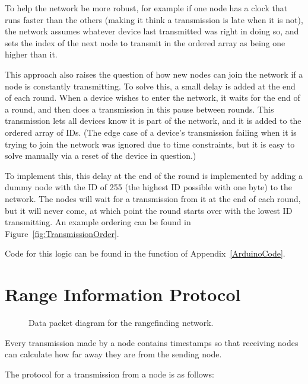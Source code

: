 To help the network be more robust, for example if one node has a clock that runs faster than the others (making it think a transmission is late when it is not), the network assumes whatever device last transmitted was right in doing so, and sets the index of the next node to transmit in the ordered array as being one higher than it.

This approach also raises the question of how new nodes can join the network if a node is constantly transmitting. To solve this, a small delay is added at the end of each round. When a device wishes to enter the network, it waits for the end of a round, and then does a transmission in this pause between rounds. This transmission lets all devices know it is part of the network, and it is added to the ordered array of IDs. (The edge case of a device's transmission failing when it is trying to join the network was ignored due to time constraints, but it is easy to solve manually via a reset of the device in question.)

To implement this, this delay at the end of the round is implemented by adding a dummy node with the ID of 255 (the highest ID possible with one byte) to the network. The nodes will wait for a transmission from it at the end of each round, but it will never come, at which point the round starts over with the lowest ID transmitting. An example ordering can be found in Figure~\ref{fig:TransmissionOrder}.

Code for this logic can be found in the  function of Appendix~\ref{ArduinoCode}.

\section{Range Information Protocol}
\begin{figure}
	\centering
	
	\decoRule
	\caption{Data packet diagram for the rangefinding network.}
	\label{fig:NetworkPacket}
\end{figure}

Every transmission made by a node contains timestamps so that receiving nodes can calculate how far away they are from the sending node.

The protocol for a transmission from a node is as follows:


